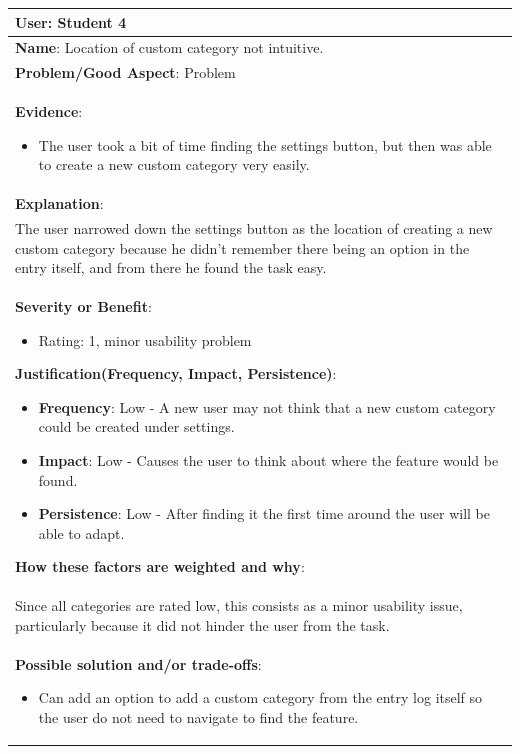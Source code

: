 \documentclass[pdftex,12pt,a4paper]{report}
\begin{document}
\begin{center}
	\begin{longtable}{|p{\textwidth}|}
	\hline
	\textbf{User}: Student 4\\
	\hline
	\textbf{Name}: Location of custom category not intuitive.\\
	\hline
	\textbf{Problem/Good Aspect}: Problem\\
	\hline
	\textbf{Evidence}:
	\begin{itemize}
	\item{The user took a bit of time finding the settings button, but then was able to create a new custom category very easily.}
	\end{itemize}\\
	\hline
	\textbf{Explanation}:\\
	The user narrowed down the settings button as the location of creating a new custom category because he didn't remember there being an option in the entry itself, and from there he found the task easy.\\
	\hline
\textbf{Severity or Benefit}:
	\begin{itemize}
	\item{Rating: 1, minor usability problem}
	\end{itemize}
	\textbf{Justification(Frequency, Impact, Persistence)}:
	\begin{itemize}
	\item{\textbf{Frequency}:} Low - A new user may not think that a new custom category could be created under settings.
	\item{\textbf{Impact}:} Low - Causes the user to think about where the feature would be found.
	\item{\textbf{Persistence}:} Low - After finding it the first time around the user will be able to adapt.
	\end{itemize}
	\textbf{How these factors are weighted and why}:\\
	Since all categories are rated low, this consists as a minor usability issue, particularly because it did not hinder the user from the task.\\
	\hline
	\textbf{Possible solution and/or trade-offs}:
	\begin{itemize}
	\item{Can add an option to add a custom category from the entry log itself so the user do not need to navigate to find the feature.}
	\end{itemize}\\
	\hline
	\end{longtable}
\end{center}
\end{document}
